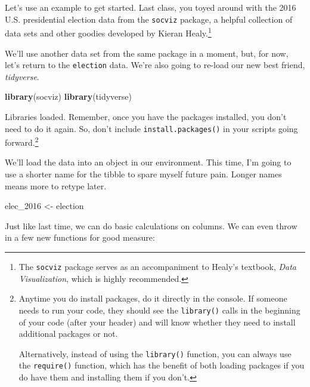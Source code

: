 \documentclass[
]{book}
\newenvironment{Shaded}{\begin{snugshade}}{\end{snugshade}}
\newcommand{\CommentTok}[1]{\textcolor[rgb]{0.56,0.35,0.01}{\textit{#1}}}
\newcommand{\FunctionTok}[1]{\textcolor[rgb]{0.13,0.29,0.53}{\textbf{#1}}}
\newcommand{\NormalTok}[1]{#1}
\newcommand{\OtherTok}[1]{\textcolor[rgb]{0.56,0.35,0.01}{#1}}
\newcommand{\SpecialCharTok}[1]{\textcolor[rgb]{0.81,0.36,0.00}{\textbf{#1}}}
\begin{document}
Let's use an example to get started. Last class, you toyed around with the 2016 U.S. presidential election data from the \texttt{socviz} package, a helpful collection of data sets and other goodies developed by Kieran Healy.\footnote{The \texttt{socviz} package serves as an accompaniment to Healy's textbook, \emph{Data Visualization}, which is highly recommended.}

We'll use another data set from the same package in a moment, but, for now, let's return to the \texttt{election} data. We're also going to re-load our new best friend, \emph{tidyverse}.

\begin{Shaded}
\begin{Highlighting}[]
\FunctionTok{library}\NormalTok{(socviz)}
\FunctionTok{library}\NormalTok{(tidyverse)}
\end{Highlighting}
\end{Shaded}

Libraries loaded. Remember, once you have the packages installed, you don't need to do it again. So, don't include \texttt{install.packages()} in your scripts going forward.\footnote{Anytime you do install packages, do it directly in the console. If someone needs to run your code, they should see the \texttt{library()} calls in the beginning of your code (after your header) and will know whether they need to install additional packages or not.

  Alternatively, instead of using the \texttt{library()} function, you can always use the \texttt{require()} function, which has the benefit of both loading packages if you do have them and installing them if you don't.}

We'll load the data into an object in our environment. This time, I'm going to use a shorter name for the tibble to spare myself future pain. Longer names means more to retype later.

\begin{Shaded}
\begin{Highlighting}[]
\NormalTok{elec\_2016 }\OtherTok{\textless{}{-}}\NormalTok{ election}
\end{Highlighting}
\end{Shaded}

Just like last time, we can do basic calculations on columns. We can even throw in a few new functions for good measure:

\begin{Shaded}
\end{Shaded}
\end{document}
